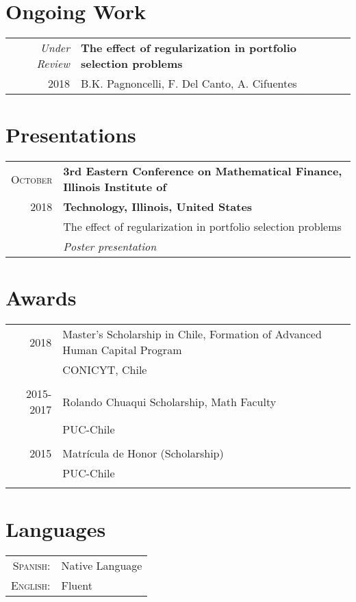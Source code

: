 \documentclass[a4paper,10pt]{article}
\begin{document}
\section{Ongoing Work}
\begin{tabular}{r|p{11cm}}
\emph{Under Review}
 	&	\textbf{The effect of regularization in portfolio selection problems} \\
\textsc{2018}
	&	\footnotesize{B.K. Pagnoncelli, F. Del Canto, A. Cifuentes}	\\
\end{tabular}
	
\section{Presentations}
\begin{tabular}{r|p{11cm}}
\textsc{October}
 	&	\textbf{3rd Eastern Conference on Mathematical Finance, Illinois Institute of}	\\
\textsc{2018}
	&	\textbf{Technology, Illinois, United States} \\
	&	The effect of regularization in portfolio selection problems	\\
	&	\emph{Poster presentation}
\end{tabular}

\section{Awards}
\begin{tabular}{rl}
\textsc{2018} 
	&	Master's Scholarship in Chile, Formation of Advanced Human Capital Program	\\
	&	CONICYT, Chile	\\
	&	\\

\textsc{2015-2017} 
	&	Rolando Chuaqui Scholarship, Math Faculty	\\
	&	PUC-Chile	\\
	&	\\
	
\textsc{2015}
	&	Matrícula de Honor (Scholarship)	\\
	&	PUC-Chile	\\
	&	\\
	
\end{tabular}

\section{Languages}
\begin{tabular}{rl}
 \textsc{Spanish:}
 	&	Native Language	\\

\textsc{English:}
	&	Fluent	\\

\end{tabular}
\end{document}
